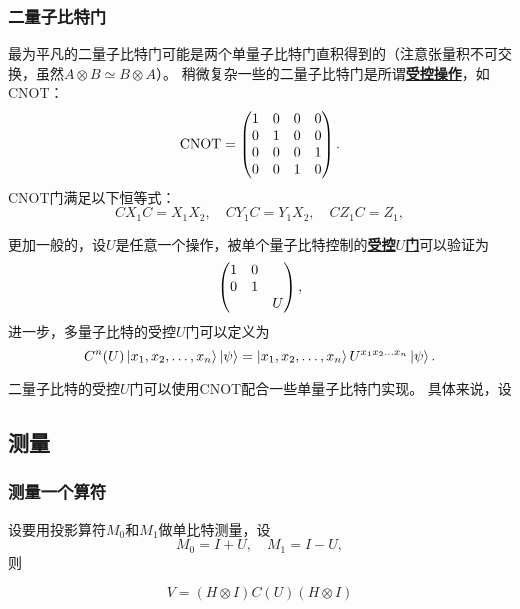 \documentclass[hyperref, UTF8, a4paper]{ctexart}
\newcommand*{\concept}[1]{\underline{\textbf{#1}}}
\begin{document}
\subsubsection{二量子比特门}

最为平凡的二量子比特门可能是两个单量子比特门直积得到的（注意张量积不可交换，虽然$A \otimes B \simeq B \otimes A$）。
稍微复杂一些的二量子比特门是所谓\concept{受控操作}，如CNOT：
\begin{equation}
    \mathrm{CNOT} = \pmqty{1 & 0 & 0 & 0 \\ 0 & 1 & 0 & 0 \\ 0 & 0 & 0 & 1 \\ 0 & 0 & 1 & 0}.
\end{equation}
CNOT门满足以下恒等式：
\begin{equation}
    C X_1 C = X_1 X_2, \quad C Y_1 C = Y_1 X_2, \quad C Z_1 C = Z_1,
\end{equation}

更加一般的，设$U$是任意一个操作，被单个量子比特控制的\concept{受控$U$门}可以验证为
\begin{equation}
    \pmqty{\dmat{1 & 0 \\ 0 & 1, U}},
\end{equation}
进一步，多量子比特的受控$U$门可以定义为
\begin{equation}
    C^n(U) \ket{x_1, x_2, \ldots, x_n} \ket{\psi} = \ket{x_1, x_2, \ldots, x_n} U^{x_1 x_2 \ldots x_n} \ket{\psi}.
\end{equation}

二量子比特的受控$U$门可以使用CNOT配合一些单量子比特门实现。
具体来说，设

\subsection{测量}\label{sec:measurement}

\subsubsection{测量一个算符}

设要用投影算符$M_0$和$M_1$做单比特测量，设
\begin{equation}
    M_0 = I + U, \quad M_1 = I - U,
\end{equation}
则

\begin{equation}
    V = (H \otimes I) C(U) (H \otimes I)
\end{equation}
\end{document}
